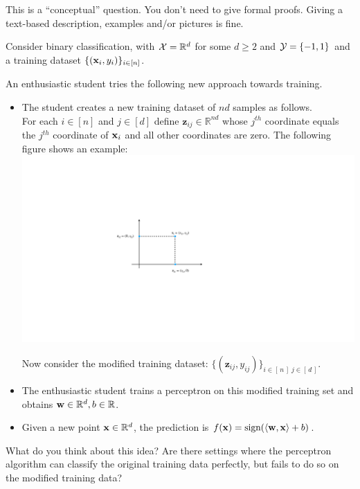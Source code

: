 This is a ``conceptual'' question. You don't need to give formal proofs. Giving a text-based description, examples and/or pictures is fine.

\vspace{5mm}
Consider binary classification, with ${\cal{X}} = \mathbb{R}^d$ for some $d \geq 2$ and ${\cal Y} = \{-1,1\}$ and a  training dataset $\{(\mathbf{x}_i,y_i)\}_{i \in [n]}$.


An enthusiastic student tries the following new approach towards training.
\begin{itemize}
    \item The student creates a new training dataset of $nd$ samples as follows.\\
    For each $i \in [n]$ and $j \in [d]$ define $\mathbf{z}_{ij} \in \mathbb{R}^{nd}$ whose $j^{th}$ coordinate equals the $j^{th}$ coordinate of $\mathbf{x}_i$ and all other coordinates are zero. The following figure shows an example:\\
    \includegraphics[width=0.5\linewidth]{midterm/images/enthusiastic.pdf}
    
     Now consider the modified training dataset:  $\{(\mathbf{z}_{ij},y_{ij})\}_{i\in [\,n\,]\; j\in [\,d\,]}$.

    \item The enthusiastic student trains a perceptron on this modified training set and obtains $\mathbf{w} \in \mathbb{R}^d, b \in \mathbb{R}$.
    \item Given a new point $\mathbf{x} \in \mathbb{R}^d$, the prediction is $f(\mathbf{x}) = \text{sign} (\langle \mathbf{w}, \mathbf{x} \rangle + b)$.
\end{itemize}

\vspace{10mm}

What do you think about this idea? Are there settings where the perceptron algorithm can classify the original training data perfectly, but fails to do so on the modified training data? 

